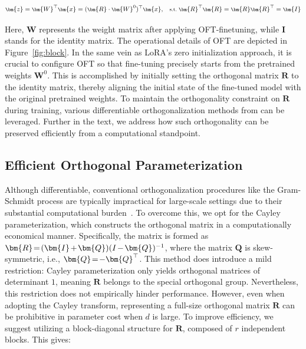 \begin{equation}\label{eq:oft_general}
    \footnotesize
    \bm{z}=\bm{W}^\top\bm{x}=(\bm{R}\cdot\bm{W}^0)^\top\bm{x},~~~\text{s.t.}~\bm{R}^\top\bm{R}=\bm{R}\bm{R}^\top=\bm{I}
\end{equation}

Here, $\bm{W}$ represents the weight matrix after applying OFT-finetuning, while $\bm{I}$ stands for the identity matrix. The operational details of OFT are depicted in Figure~\ref{fig:block}. In the same vein as LoRA's zero initialization approach, it is crucial to configure OFT so that fine-tuning precisely starts from the pretrained weights $\bm{W}^0$. This is accomplished by initially setting the orthogonal matrix $\bm{R}$ to the identity matrix, thereby aligning the initial state of the fine-tuned model with the original pretrained weights. To maintain the orthogonality constraint on $\bm{R}$ during training, various differentiable orthogonalization methods from \cite{liu2021orthogonal,lezcano2019cheap} can be leveraged. Further in the text, we address how such orthogonality can be preserved efficiently from a computational standpoint.

\subsection{Efficient Orthogonal Parameterization}\label{sect:eff_ortho}

Although differentiable, conventional orthogonalization procedures like the Gram-Schmidt process are typically impractical for large-scale settings due to their substantial computational burden~\cite{liu2021orthogonal}. To overcome this, we opt for the Cayley parameterization, which constructs the orthogonal matrix in a computationally economical manner. Specifically, the matrix is formed as $\thickmuskip=2mu \medmuskip=2mu \bm{R}=(\bm{I}+\bm{Q})(I-\bm{Q})^{-1}$, where the matrix $\bm{Q}$ is skew-symmetric, i.e., $\thickmuskip=2mu \medmuskip=2mu \bm{Q}=-\bm{Q}^\top$. This method does introduce a mild restriction: Cayley parameterization only yields orthogonal matrices of determinant $1$, meaning $\bm{R}$ belongs to the special orthogonal group. Nevertheless, this restriction does not empirically hinder performance. However, even when adopting the Cayley transform, representing a full-size orthogonal matrix $\bm{R}$ can be prohibitive in parameter cost when $d$ is large. To improve efficiency, we suggest utilizing a block-diagonal structure for $\bm{R}$, composed of $r$ independent blocks. This gives:

